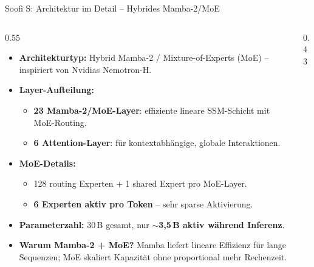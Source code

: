 \documentclass[aspectratio=1610, xcolor=dvipsnames, 9pt]{beamer}
\begin{document}
\begin{frame}{Soofi S: Architektur im Detail -- Hybrides Mamba-2/MoE}
  \begin{columns}
    \begin{column}{0.55\textwidth}
      \begin{itemize}
        \item \textbf{Architekturtyp:} Hybrid Mamba-2 / Mixture-of-Experts (MoE) -- inspiriert von Nvidias Nemotron-H.
        \item \textbf{Layer-Aufteilung:}
          \begin{itemize}\small
            \item \textbf{23 Mamba-2/MoE-Layer}: effiziente lineare SSM-Schicht mit MoE-Routing.
            \item \textbf{6 Attention-Layer}: für kontextabhängige, globale Interaktionen.
          \end{itemize}
        \item \textbf{MoE-Details:}
          \begin{itemize}\small
            \item 128 routing Experten + 1 shared Expert pro MoE-Layer.
            \item \textbf{6 Experten aktiv pro Token} -- sehr sparse Aktivierung.
          \end{itemize}
        \item \textbf{Parameterzahl:} 30\,B gesamt, nur \textbf{$\sim$3,5\,B aktiv während Inferenz}.
        \item \textbf{Warum Mamba-2 + MoE?} Mamba liefert lineare Effizienz für lange Sequenzen; MoE skaliert Kapazität ohne proportional mehr Rechenzeit.
      \end{itemize}
    \end{column}
    \begin{column}{0.43\textwidth}
      \centering
\end{column}
\end{columns}
\end{frame}
\end{document}
